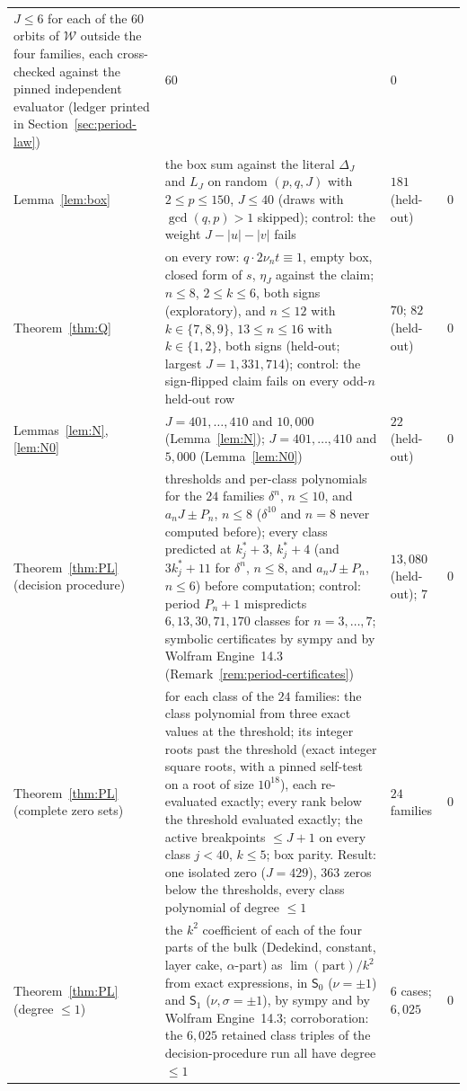\documentclass[11pt]{article}
\theoremstyle{definition}
\begin{document}
\begin{small}
\begin{longtable}{@{}L{0.24\textwidth}L{0.41\textwidth}L{0.2\textwidth}L{0.07\textwidth}@{}}
$J\leq6$ for each of the $60$ orbits of $\mathcal W$ outside the four
families, each cross-checked against the pinned independent evaluator
(ledger printed in Section~\ref{sec:period-law}) & $60$ & $0$\\
Lemma~\ref{lem:box} & the box sum against the literal $\Delta_J$ and
$L_J$ on random $(p,q,J)$ with $2\leq p\leq150$, $J\leq40$ (draws with
$\gcd(q,p)>1$ skipped); control: the weight $J-|u|-|v|$ fails & $181$
(held-out) & $0$\\
Theorem~\ref{thm:Q} & on every row: $q\cdot2\nu_nt\equiv1$, empty box,
closed form of $s$, $\eta_J$ against the claim; $n\leq8$, $2\leq k\leq6$,
both signs (exploratory), and $n\leq12$ with $k\in\{7,8,9\}$, $13\leq n\leq16$
with $k\in\{1,2\}$, both signs (held-out; largest $J=1{,}331{,}714$);
control: the sign-flipped claim fails on every odd-$n$ held-out row & $70$;
$82$ (held-out) & $0$\\
Lemmas~\ref{lem:N}, \ref{lem:N0} & $J=401,\ldots,410$ and $10{,}000$
(Lemma~\ref{lem:N}); $J=401,\ldots,410$ and $5{,}000$
(Lemma~\ref{lem:N0}) & $22$ (held-out) & $0$\\
Theorem~\ref{thm:PL} (decision procedure) & thresholds and per-class
polynomials for the $24$ families $\delta^n$, $n\leq10$, and
$a_nJ\pm P_n$, $n\leq8$ ($\delta^{10}$ and $n=8$ never computed
before); every class predicted at $k^*_j+3$, $k^*_j+4$ (and $3k^*_j+11$
for $\delta^n$, $n\leq8$, and $a_nJ\pm P_n$, $n\leq6$) before
computation; control: period $P_n+1$ mispredicts $6,13,30,71,170$
classes for $n=3,\ldots,7$; symbolic certificates by sympy and by
Wolfram Engine~14.3 (Remark~\ref{rem:period-certificates}) & $13{,}080$
(held-out); $7$ & $0$\\
Theorem~\ref{thm:PL} (complete zero sets) & for each class of the $24$
families: the class polynomial from three exact values at the
threshold; its integer roots past the threshold (exact integer square
roots, with a pinned self-test on a root of size $10^{18}$), each
re-evaluated exactly; every rank below the threshold evaluated exactly;
the active breakpoints $\leq J+1$ on every class $j<40$, $k\leq5$; box
parity.  Result: one isolated zero ($J=429$), $363$ zeros below the
thresholds, every class polynomial of degree $\leq1$ & $24$ families
& $0$\\
Theorem~\ref{thm:PL} (degree $\leq1$) & the $k^2$ coefficient of each of
the four parts of the bulk (Dedekind, constant, layer cake,
$\alpha$-part) as $\lim(\text{part})/k^2$ from exact expressions, in
$\mathsf S_0$ ($\nu=\pm1$) and $\mathsf S_1$ ($\nu,\sigma=\pm1$), by sympy
and by Wolfram Engine~14.3; corroboration: the
$6{,}025$ retained class triples of the decision-procedure run all have
degree $\leq1$ & $6$ cases; $6{,}025$ & $0$\\
\bottomrule
\end{longtable}
\end{small}
\end{document}
